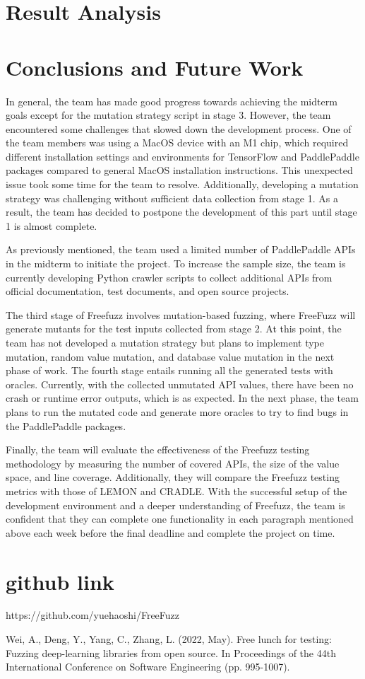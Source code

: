 \documentclass[sigconf]{acmart}
\begin{document}
\section{Result Analysis}


\section{Conclusions and Future Work}
In general, the team has made good progress towards achieving the midterm goals except for the mutation strategy script in stage 3. However, the team encountered some challenges that slowed down the development process. One of the team members was using a MacOS device with an M1 chip, which required different installation settings and environments for TensorFlow and PaddlePaddle packages compared to general MacOS installation instructions. This unexpected issue took some time for the team to resolve. Additionally, developing a mutation strategy was challenging without sufficient data collection from stage 1. As a result, the team has decided to postpone the development of this part until stage 1 is almost complete.
\par As previously mentioned, the team used a limited number of PaddlePaddle APIs in the midterm to initiate the project. To increase the sample size, the team is currently developing Python crawler scripts to collect additional APIs from official documentation, test documents, and open source projects.
\par The third stage of Freefuzz involves mutation-based fuzzing, where FreeFuzz will generate mutants for the test inputs collected from stage 2. At this point, the team has not developed a mutation strategy but plans to implement type mutation, random value mutation, and database value mutation in the next phase of work. The fourth stage entails running all the generated tests with oracles. Currently, with the collected unmutated API values, there have been no crash or runtime error outputs, which is as expected. In the next phase, the team plans to run the mutated code and generate more oracles to try to find bugs in the PaddlePaddle packages.
\par Finally, the team will evaluate the effectiveness of the Freefuzz testing methodology by measuring the number of covered APIs, the size of the value space, and line coverage. Additionally, they will compare the Freefuzz testing metrics with those of LEMON and CRADLE.
With the successful setup of the development environment and a deeper understanding of Freefuzz, the team is confident that they can complete one functionality in each paragraph mentioned above each week before the final deadline and complete the project on time.

\section{github link}
https://github.com/yuehaoshi/FreeFuzz
\begin{thebibliography}{9}
 Wei, A., Deng, Y., Yang, C.,  Zhang, L. (2022, May). Free lunch for testing: Fuzzing deep-learning libraries from open source. In Proceedings of the 44th International Conference on Software Engineering (pp. 995-1007).
\end{thebibliography}
\end{document}
